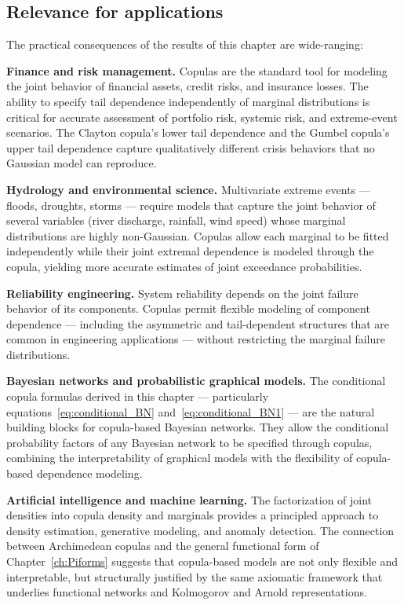 \subsection{Relevance for applications}

The practical consequences of the results of this chapter are wide-ranging:

\noindent\textbf{Finance and risk management.} Copulas are the standard tool for
modeling the joint behavior of financial assets, credit risks, and insurance losses.
The ability to specify tail dependence independently of marginal distributions is
critical for accurate assessment of portfolio risk, systemic risk, and extreme-event
scenarios. The Clayton copula's lower tail dependence and the Gumbel copula's upper
tail dependence capture qualitatively different crisis behaviors that no Gaussian model
can reproduce.

\noindent\textbf{Hydrology and environmental science.} Multivariate extreme events —
floods, droughts, storms — require models that capture the joint behavior of several
variables (river discharge, rainfall, wind speed) whose marginal distributions are
highly non-Gaussian. Copulas allow each marginal to be fitted independently while
their joint extremal dependence is modeled through the copula, yielding more accurate
estimates of joint exceedance probabilities.

\noindent\textbf{Reliability engineering.} System reliability depends on the joint
failure behavior of its components. Copulas permit flexible modeling of component
dependence — including the asymmetric and tail-dependent structures that are common
in engineering applications — without restricting the marginal failure distributions.

\noindent\textbf{Bayesian networks and probabilistic graphical models.} The
conditional copula formulas derived in this chapter — particularly
equations~\eqref{eq:conditional_BN} and~\eqref{eq:conditional_BN1} — are the
natural building blocks for copula-based Bayesian networks. They allow the
conditional probability factors of any Bayesian network to be specified through
copulas, combining the interpretability of graphical models with the flexibility of
copula-based dependence modeling.

\noindent\textbf{Artificial intelligence and machine learning.} The factorization of
joint densities into copula density and marginals provides a principled approach to
density estimation, generative modeling, and anomaly detection. The connection between
Archimedean copulas and the general functional form of Chapter~\ref{ch:Piforms}
suggests that copula-based models are not only flexible and interpretable, but
structurally justified by the same axiomatic framework that underlies functional
networks and Kolmogorov and Arnold representations.


